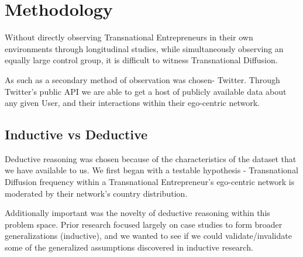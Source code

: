 \section{Methodology}
Without directly observing Transnational Entrepreneurs in their own
environments through longitudinal studies, while simultaneously
observing an equally large control group, it is difficult to witness
Transnational Diffusion.

As such as a secondary method of observation was chosen-
Twitter. Through Twitter's public API we are able to get a host of
publicly available data about any given User, and their interactions
within their ego-centric network.

\subsection{Inductive vs Deductive}
Deductive reasoning was chosen because of the characteristics of the
dataset that we have available to us. We first began with a testable
hypothesis - Transnational Diffusion frequency within a Transnational
Entrepreneur's ego-centric network is moderated by their network's
country distribution.

Additionally important was the novelty of deductive reasoning within
this problem space. Prior research focused largely on case studies to
form broader generalizations (inductive), and we wanted to see if we
could validate/invalidate some of the generalized assumptions
discovered in inductive research.
